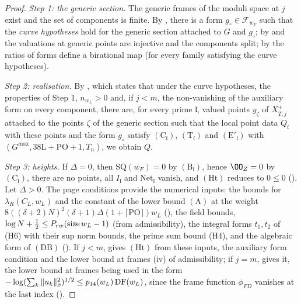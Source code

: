 \begin{proof}
\emph{Step 1: the generic section.} The generic frames of the moduli space at $j$ exist and the set of components is finite.
By , there is a form $g_\circ\in\mathcal F_{w_F}$ such that the \emph{curve
hypotheses} hold for the generic section attached to $G$ and $g_\circ$; by  and
 the valuations at generic points are injective and the components split; by
 the ratios of forms define a birational map (for every family satisfying the
curve hypotheses).

\emph{Step 2: realisation.} By , which states that under
the curve hypotheses, the properties of Step 1, $n_{w_L}>0$ and, if $j<m$, the non-vanishing of the auxiliary form on every
component, there are, for every prime $\mathfrak l$, valued points $y_\zeta$ of $X^+_{T,j}$ attached to the points $\zeta$ of the
generic section such that the local point data $Q_{\mathfrak l}$ with these points and the form $g_\circ$ satisfy $(\mathrm C_{\mathfrak l})$,
$(\mathrm T_{\mathfrak l})$ and $(\mathrm E'_{\mathfrak l})$ with $(G^{\max},38\mathrm L+\mathrm{PO}+1,T_n)$, we obtain $Q$.

\emph{Step 3: heights.} If $\Delta=0$, then $\mathrm{SQ}(w_F)=0$ by $(\mathrm B_{\mathfrak l})$, hence $\OO_Z=0$ by $(\mathrm C_{\mathfrak l})$,
there are no points, all $I_{\mathfrak l}$ and $\mathrm{Net}_{\mathfrak l}$ vanish, and $(\mathrm{Ht})$ reduces to $0\le0$
(). Let $\Delta>0$. The page conditions provide the numerical
inputs: the bounds for $\lambda_R(C_L,w_L)$ and the constant of the lower bound $(\mathrm A)$ at the weight
$8((\delta+2)N)^2(\delta+1)\Delta(1+\lceil\mathrm{PO}\rceil)w_L$ (), the field bounds,
$\log N+\frac12\le P_{rw}(\operatorname{size} w_L-1)$ (from admissibility), the integral forms $t_1,t_2$ of (H6) with their sup norm
bounds, the prime sum bound (H4), and the algebraic form of $(\mathrm{DB})$ (). If
$j<m$,  gives $(\mathrm{Ht})$ from these inputs, the auxiliary
form condition and the lower bound at frames (iv) of admissibility; if $j=m$,
 gives it, the lower bound at frames being used in the form
$-\log(\sum_k\|u_k\|_x^2)^{1/2}\le p_{14}(w_L)\operatorname{DF}(w_L)$, since the frame function $\phi_{FD}$ vanishes at the last index
().
\end{proof}

